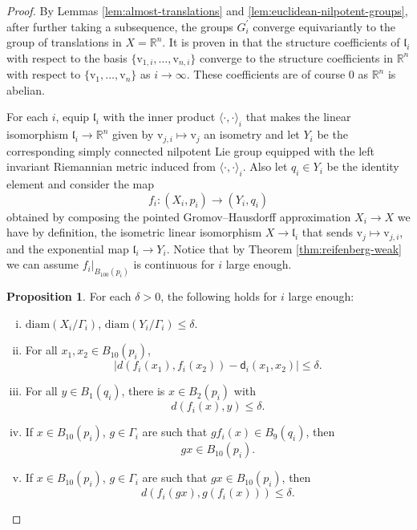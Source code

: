 \documentclass[12pt]{amsart}
\theoremstyle{definition}
\def\fnum{equation}
\newtheorem{proposition}[\fnum]{Proposition}
\numberwithin{equation}{section}
\newcommand{\diam}{{\text {diam}}}
\newcommand{\vv}{\text{v}}
\begin{document}
\begin{proof}
By Lemmas \ref{lem:almost-translations} and  \ref{lem:euclidean-nilpotent-groups}, after further taking a subsequence, the groups $G_i^{\prime}$ converge equivariantly to the group of translations in $X = \mathbb{R}^n$. It is proven in \cite[Lemma 8.2 and Lemma 2.64]{zamora-limits} that the structure coefficients of $\mathfrak{l}_i$ with respect to the basis $\{ \vv_{1,i}, \ldots , \vv_{n,i}\} $ converge to the structure coefficients in $\mathbb{R}^n$ with respect to $\{ \vv_1, \ldots , \vv_n \}$ as $i \to \infty$. These coefficients are of course $0$ as $\mathbb{R}^n$ is abelian. 

For each $i$, equip $\mathfrak{l}_i$ with the inner product $\langle \cdot , \cdot  \rangle _i  $ that makes the linear isomorphism $\mathfrak{l}_i \to \mathbb{R}^n$ given by $\vv_{j,i} \mapsto \vv_j $ an isometry and let $Y_i$ be the corresponding simply connected nilpotent Lie group equipped with the left invariant Riemannian metric induced from $\langle \cdot , \cdot \rangle _i$. Also let $q_i \in Y_i $ be the identity element and consider the map
\[  f_i :  ( X_i , p_i )  \to  ( Y_i , q_i )    \]
obtained by composing the pointed Gromov--Hausdorff approximation $X_i \to X$ we have by definition, the isometric linear isomorphism  $X \to \mathfrak{l}_i$ that sends $\vv_j \mapsto \vv_{j,i}$, and the exponential map $ \mathfrak{l}_i \to Y_i$. Notice that by Theorem \ref{thm:reifenberg-weak} we can assume $f_i\vert _{B_{100}(p_i)}$ is continuous for $i$ large enough.  

\begin{proposition}\label{pro:almost-equivariant}
For each $\delta  > 0 $, the following holds for $i$ large enough:
\begin{enumerate}[i.]
    \item $\diam (X_i / \Gamma_i )$, $\diam (Y_i / \Gamma _i) \leq \delta$.\label{pro:almost-equivariant-a}
    \item  For all $x_1, x_2 \in B_{10}(p_i)$,\label{pro:almost-equivariant-b} 
    \[    \vert d( f_i (x_1), f_i (x_2)) - \mathsf{d}_i(x_1, x_2) \vert \leq \delta .    \]
    \item For all $y \in B_1(q_i)$, there is $x \in B_2 (p_i)$ with 
    \[   d(f_i(x) ,y ) \leq \delta .              \]\label{pro:almost-equivariant-b.5}
    \item If $x \in B_{10}(p_i)$, $g \in \Gamma_i$ are such that $g f_i(x) \in B_9 (q_i)$, then \label{pro:almost-equivariant-c}
    \[     g x \in B_{10}(p_i)  .    \]
    \item If $x \in B_{10}(p_i)$, $g \in \Gamma_i$ are such that $gx \in B_{10}(p_i)$, then \label{pro:almost-equivariant-d}
    \[  d(f_i (gx) , g( f_i (x) )) \leq \delta .     \]
\end{enumerate}


\end{proposition}
\end{proof}
\end{document}

